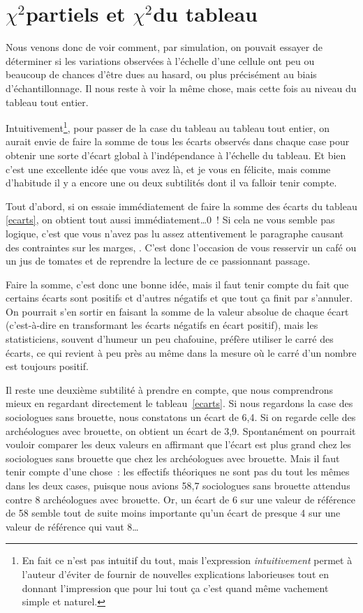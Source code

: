 \documentclass[a4paper,10pt,twoside,francais]{report}
\newcommand{\chidpdf}{\texorpdfstring{$\chi^2$\xspace}{X\texttwosuperior\xspace}}
\begin{document}
\section{\chidpdf partiels et \chidpdf du tableau} 
\label{ssec-chidpartiels}

Nous venons donc de voir comment, par simulation, on pouvait essayer
de déterminer si les variations observées à l'échelle d'une cellule
ont peu ou beaucoup de chances d'être dues au hasard, ou plus
précisément au biais d'échantillonnage. Il nous reste à voir la même
chose, mais cette fois au niveau du tableau tout entier.

Intuitivement\footnote{En fait ce n'est pas intuitif du tout, mais
  l'expression \textit{intuitivement} permet à l'auteur d'éviter de
  fournir de nouvelles explications laborieuses tout en donnant
  l'impression que pour lui tout ça c'est quand même vachement simple
  et naturel.},  pour passer de la case du tableau au tableau tout
entier, on aurait envie de faire la somme de tous les écarts observés
dans chaque case pour obtenir une sorte d'écart global à
l'indépendance à l'échelle du tableau. Et bien c'est une excellente
idée que vous avez là, et je vous en félicite, mais comme d'habitude
il y a encore une ou deux subtilités dont il va falloir tenir compte.

Tout d'abord, si on essaie immédiatement de faire la somme des écarts
du tableau \vref{ecarts}, on obtient tout aussi
immédiatement\ldots 0~! Si cela ne vous semble pas logique, c'est que
vous n'avez pas lu assez attentivement le paragraphe causant des
contraintes sur les marges, . C'est donc
l'occasion de vous resservir un café ou un jus de tomates et de
reprendre la lecture de ce passionnant passage.

Faire la somme, c'est donc une bonne idée, mais il faut tenir compte
du fait que certains écarts sont positifs et d'autres négatifs et que
tout ça finit par s'annuler. On pourrait s'en sortir en faisant la
somme de la valeur absolue de chaque écart (c'est-à-dire en
transformant les écarts négatifs en écart positif), mais les
statisticiens, souvent d'humeur un peu chafouine, préfère utiliser le
carré des écarts, ce qui revient à peu près au même dans la mesure où
le carré d'un nombre est toujours positif.

Il reste une deuxième subtilité à prendre en compte, que nous
comprendrons mieux en regardant directement le tableau~\ref{ecarts}. 
Si nous regardons la case des sociologues sans brouette, nous
constatons un écart de 6,4. Si on regarde celle des archéologues avec
brouette, on obtient un écart de 3,9. Spontanément on pourrait vouloir
comparer les deux valeurs en affirmant que l'écart est plus grand chez
les sociologues sans brouette que chez les archéologues avec
brouette. Mais il faut tenir compte d'une chose~: les effectifs
théoriques ne sont pas du tout les mêmes dans les deux cases, puisque
nous avions 58,7 sociologues sans brouette attendus contre 8
archéologues avec brouette. Or, un écart de 6 sur une valeur de
référence de 58 semble tout de suite moins importante qu'un écart de
presque 4 sur une valeur de référence qui vaut 8\ldots
\end{document}
